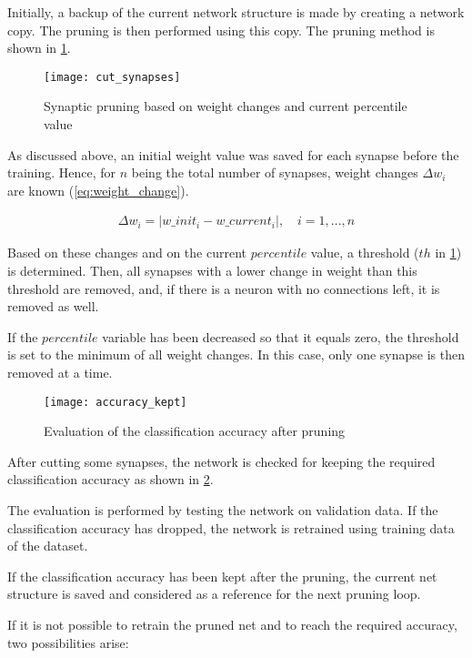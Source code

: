 Initially, a backup of the current network structure is made by creating a network copy. The pruning is then performed using this copy. The pruning method is shown in \cref{img:cut_synapses}.

\begin{figure}[H]
  \centering
  \texttt{[image: cut\_synapses]}
  \caption{Synaptic pruning based on weight changes and current percentile value}
  \label{img:cut_synapses}
\end{figure}

As discussed above, an initial weight value was saved for each synapse before the training. Hence, for $ n $ being the total number of synapses, weight changes $ \Delta w_i $ are known (\ref{eq:weight_change}).

\begin{align} \label{eq:weight_change}
\Delta w_i = |w\_init_i - w\_current_i|, \quad i = 1, ..., n
\end{align}

Based on these changes and on the current $ percentile $ value, a threshold ($ th $ in \cref{img:cut_synapses}) is determined. Then, all synapses with a lower change in weight than this threshold are removed, and, if there is a neuron with no connections left, it is removed as well.

If the $ percentile $ variable has been decreased so that it equals zero, the threshold is set to the minimum of all weight changes. In this case, only one synapse is then removed at a time.

\begin{figure}[H]
  \centering
  \texttt{[image: accuracy\_kept]}
  \caption{Evaluation of the classification accuracy after pruning}
  \label{img:accuracy_kept}
\end{figure}

After cutting some synapses, the network is checked for keeping the required classification accuracy as shown in \cref{img:accuracy_kept}.

The evaluation is performed by testing the network on validation data. If the classification accuracy has dropped, the network is retrained using training data of the dataset.

If the classification accuracy has been kept after the pruning, the current net structure is saved and considered as a reference for the next pruning loop.

If it is not possible to retrain the pruned net and to reach the required accuracy, two possibilities arise:

